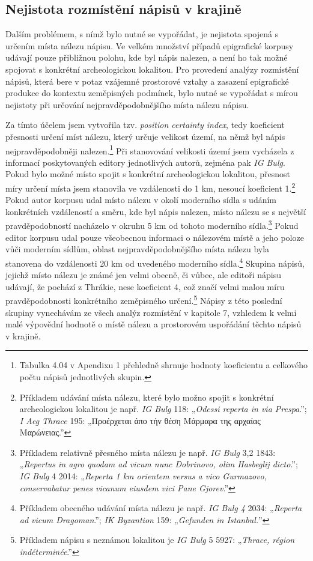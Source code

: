 
\subsection[nejistota-rozmístění-nápisů-v-krajině]{Nejistota rozmístění nápisů v krajině}

Dalším problémem, s nímž bylo nutné se vypořádat, je nejistota spojená s určením místa nálezu nápisu. Ve velkém množství případů epigrafické korpusy udávají pouze přibližnou polohu, kde byl nápis nalezen, a není ho tak možné spojovat s konkrétní archeologickou lokalitou. Pro provedení analýzy rozmístění nápisů, která bere v potaz vzájemné prostorové vztahy a zasazení epigrafické produkce do kontextu zeměpisných podmínek, bylo nutné se vypořádat s mírou nejistoty při určování nejpravděpodobnějšího místa nálezu nápisu.

Za tímto účelem jsem vytvořila tzv. {\em position certainty index}, tedy koeficient přesnosti určení míst nálezu, který určuje velikost území, na němž byl nápis nejpravděpodobněji nalezen.\footnote{Tabulka 4.04 v Apendixu 1 přehledně shrnuje hodnoty koeficientu a celkového počtu nápisů jednotlivých skupin.} Při stanovování velikosti území jsem vycházela z informací poskytovaných editory jednotlivých autorů, zejména pak {\em IG Bulg}. Pokud bylo možné místo spojit s konkrétní archeologickou lokalitou, přesnost míry určení místa jsem stanovila ve vzdálenosti do 1 km, nesoucí koeficient 1.\footnote{Příkladem udávání místa nálezu, které bylo možno spojit s konkrétní archeologickou lokalitou je např. {\em IG Bulg} 118: „{\em Odessi reperta in via Prespa}.”; {\em I Aeg Thrace} 195: „Προέρχεται άπο τήν θέση Μάρμαρα της αρχαίας Μαρώνειας.”} Pokud autor korpusu udal místo nálezu v okolí moderního sídla s udáním konkrétních vzdáleností a směru, kde byl nápis nalezen, místo nálezu se s největší pravděpodobností nacházelo v okruhu 5 km od tohoto moderního sídla.\footnote{Příkladem relativně přesného místa nálezu je např. {\em IG Bulg} 3,2 1843: „{\em Repertus in agro quodam ad vicum nunc Dobrinovo, olim Hasbeglij dicto}.”; {\em IG Bulg} 4 2014: „{\em Reperta 1 km orientem versus a vico Gurmazovo, conservabatur penes vicanum eiusdem vici Pane Gjorev}.”} Pokud editor korpusu udal pouze všeobecnou informaci o nálezovém místě a jeho poloze vůči moderním sídlům, oblast nejpravděpodobnějšího místa nálezu byla stanovena do vzdálenosti 20 km od uvedeného moderního sídla.\footnote{Příkladem obecného udávání místa nálezu je např. {\em IG Bulg 4} 2034: „{\em Reperta ad vicum Dragoman}.”; {\em IK Byzantion} 159: „{\em Gefunden in Istanbul.}”} Skupina nápisů, jejichž místo nálezu je známé jen velmi obecně, či vůbec, ale editoři nápisu udávají, že pochází z Thrákie, nese koeficient 4, což značí velmi malou míru pravděpodobnosti konkrétního zeměpisného určení.\footnote{Příkladem nápisu s neznámou lokalitou je {\em IG Bulg} 5 5927: „{\em Thrace, région indéterminée}.”} Nápisy z této poslední skupiny vynechávám ze všech analýz rozmístění v kapitole 7, vzhledem k velmi malé výpovědní hodnotě o místě nálezu a prostorovém uspořádání těchto nápisů v krajině.

